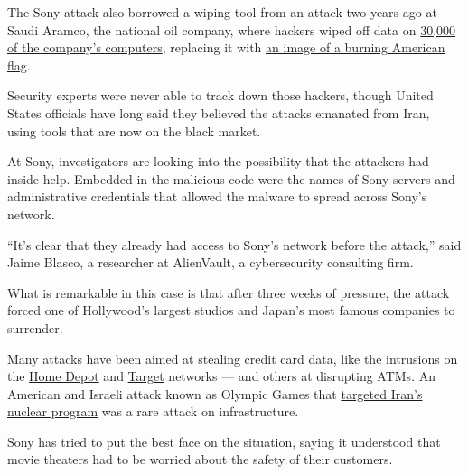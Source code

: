 The Sony attack also borrowed a wiping tool from an attack two years ago
at Saudi Aramco, the national oil company, where hackers wiped off data
on
\href{http://bits.blogs.nytimes.com/2012/08/23/hackers-lay-claim-to-saudi-aramco-cyberattack/?module=Search\&mabReward=relbias\%3Ar\%2C\%7B\%221\%22\%3A\%22RI\%3A8\%22\%7D}{30,000
of the company's computers}, replacing it with
\href{http://bits.blogs.nytimes.com/2012/08/27/connecting-the-dots-after-cyberattack-on-saudi-aramco/?module=Search\&mabReward=relbias\%3Ar\%2C\%7B\%221\%22\%3A\%22RI\%3A8\%22\%7D}{an
image of a burning American flag}.

Security experts were never able to track down those hackers, though
United States officials have long said they believed the attacks
emanated from Iran, using tools that are now on the black market.

At Sony, investigators are looking into the possibility that the
attackers had inside help. Embedded in the malicious code were the names
of Sony servers and administrative credentials that allowed the malware
to spread across Sony's network.

``It's clear that they already had access to Sony's network before the
attack,'' said Jaime Blasco, a researcher at AlienVault, a cybersecurity
consulting firm.

What is remarkable in this case is that after three weeks of pressure,
the attack forced one of Hollywood's largest studios and Japan's most
famous companies to surrender.

Many attacks have been aimed at stealing credit card data, like the
intrusions on the
\href{http://bits.blogs.nytimes.com/2014/09/08/home-depot-confirms-that-it-was-hacked/?module=Search\&mabReward=relbias\%3Ar\%2C\%7B\%221\%22\%3A\%22RI\%3A8\%22\%7D}{Home
Depot} and
\href{http://www.nytimes.com/2014/03/14/business/target-missed-signs-of-a-data-breach.html?module=Search\&mabReward=relbias\%3As\%2C\%7B\%221\%22\%3A\%22RI\%3A8\%22\%7D}{Target}
networks --- and others at disrupting ATMs. An American and Israeli
attack known as Olympic Games that
\href{http://www.nytimes.com/2012/06/01/world/middleeast/obama-ordered-wave-of-cyberattacks-against-iran.html?pagewanted=all\&module=Search\&mabReward=relbias\%3Aw\%2C\%7B\%221\%22\%3A\%22RI\%3A8\%22\%7D}{targeted
Iran's nuclear program} was a rare attack on infrastructure.

Sony has tried to put the best face on the situation, saying it
understood that movie theaters had to be worried about the safety of
their customers.

